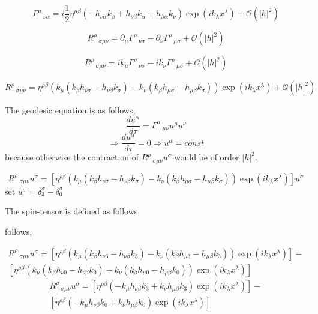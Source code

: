 \documentclass[12pt,a4paper]{article}
\begin{document}
	$$
	\Gamma^{\mu}\,_{\nu \alpha} = i\frac{1}{2}\eta^{\mu \beta}  \left(-h_{\nu \alpha} k_{\beta}+h_{\nu \beta} k_{\alpha}+h_{\beta \alpha} k_{\nu}\right)  \exp\left(i k_{\lambda} x^{\lambda}\right) +  \mathcal{O}(|h|^2)
	$$
	
	
	$$
	R^{\rho}\,_{\sigma \mu \nu} = \partial_\mu \Gamma^{\rho}\,_{\nu \sigma} - \partial_\nu \Gamma^{\rho}\,_{\mu \sigma} + \mathcal{O}(|h|^2)
	$$
	
	$$
	R^{\rho}\,_{\sigma \mu \nu} = i k_\mu \Gamma^{\rho}\,_{\nu \sigma} -  i k_\nu \Gamma^{\rho}\,_{\mu \sigma} + \mathcal{O}(|h|^2)
	$$
	
	$$
	R^{\rho}\,_{\sigma \mu \nu} = \eta^{\rho \beta}\left(k_\mu \left(k_\beta h_{\nu \sigma} - h_{\nu \beta}  k_\sigma \right) - k_\nu \left( k_\beta h_{\mu \sigma} - h_{\mu \beta}  k_\sigma\right) \right) \exp\left(i k_{\lambda} x^{\lambda}\right)  + \mathcal{O}(|h|^2)
	$$
	
	The geodesic equation is as follows,
	$$
	\frac{du^\alpha}{d \tau} = \Gamma^{\alpha}\,_{\mu \nu}u^\mu u^\nu
	$$
	$$%
	\Rightarrow
	\frac{du^\alpha}{d \tau} = 0
	\Rightarrow u^\alpha = const
	$$
	because otherwise the contraction of $R^{\rho}\,_{\sigma \mu \nu}u^\sigma$ would be of order $|h|^2$.
	
	$$
	R^{\rho}\,_{\sigma \mu \nu}u^\sigma = \left[\eta^{\rho \beta}\left(k_\mu \left(k_\beta h_{\nu \sigma} - h_{\nu \beta}  k_\sigma \right) - k_\nu \left( k_\beta h_{\mu \sigma} - h_{\mu \beta}  k_\sigma\right) \right) \exp\left(i k_{\lambda} x^{\lambda}\right)\right] u^\sigma
	$$
	set $u^\sigma = \delta^\sigma_3 - \delta^\sigma_0$
	
	The spin-tensor is defined as follows,
	
	follows,
	
	\begin{multline}
		R^{\rho}\,_{\sigma \mu \nu}u^\sigma = \left[\eta^{\rho \beta}\left(k_\mu \left(k_\beta h_{\nu 3} - h_{\nu \beta}  k_3
		 \right) - k_\nu \left( k_\beta h_{\mu 3} - h_{\mu \beta}  k_3 \right) \right) \exp\left(i k_{\lambda} x^{\lambda}\right)\right] - \\
		\left[\eta^{\rho \beta}\left(k_\mu \left(k_\beta h_{\nu 0} - h_{\nu \beta}  k_0 \right) - k_\nu \left( k_\beta h_{\mu 0} - h_{\mu \beta}  k_0\right) \right) \exp\left(i k_{\lambda} x^{\lambda}\right)\right] 
	\end{multline}
	\begin{multline}
		R^{\rho}\,_{\sigma \mu \nu}u^\sigma = \left[\eta^{\rho \beta}\left(- k_\mu  h_{\nu \beta}  k_3 + k_\nu h_{\mu \beta}  k_3  \right) \exp\left(i k_{\lambda} x^{\lambda}\right)\right] - \\
		\left[\eta^{\rho \beta}\left( - k_\mu  h_{\nu \beta}  k_0 + k_\nu  h_{\mu \beta}  k_0 \right) \exp\left(i k_{\lambda} x^{\lambda}\right)\right] 
	\end{multline}
\end{document}
